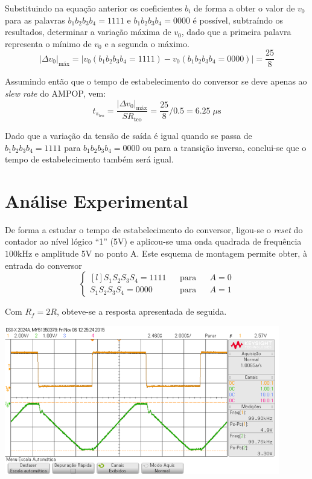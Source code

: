 \documentclass[a4paper,11pt]{report}
\begin{document}
Substituindo na equação anterior os coeficientes $b_i$ de forma a obter o valor de $v_0$ para as palavras $b_1b_2b_3b_4=1111$ e $b_1b_2b_3b_4=0000$ é possível, subtraíndo os resultados, determinar a variação máxima de $v_0$, dado que a primeira palavra representa o mínimo de $v_0$ e a segunda o máximo.
\begin{equation}
|\Delta v_0|_{\textrm{máx}}=|v_0(b_1b_2b_3b_4=1111)-v_0(b_1b_2b_3b_4=0000)|=\frac{25}{8}
\end{equation}

Assumindo então que o tempo de estabelecimento do conversor se deve apenas ao \emph{slew rate} do AMPOP, vem:
\begin{equation}
t_{s_{\textrm{teo}}}=\dfrac{|\Delta v_0|_{\textrm{máx}}}{SR_{\textrm{teo}}}=\frac{25}{8}/0.5=6.25\;\mu\textrm{s}
\end{equation}

Dado que a variação da tensão de saída é igual quando se passa de $b_1b_2b_3b_4=1111$ para $b_1b_2b_3b_4=0000$ ou para a transição inversa, conclui-se que o tempo de estabelecimento também será igual.

\section{Análise Experimental}

De forma a estudar o tempo de estabelecimento do conversor, ligou-se o \emph{reset} do contador ao nível lógico ``1'' (5V) e aplicou-se uma onda quadrada de frequência $100$kHz e amplitude 5V no ponto A. Este esquema de montagem permite obter, à entrada do conversor
\begin{equation*}
\left\{ \begin{matrix*}[l]
 S_1S_2S_3S_4=1111 && \textrm{para} && A=0\\[0.3cm]
 S_1S_2S_3S_4=0000 && \textrm{para} && A=1
\end{matrix*} \right.
\end{equation*}

Com $R_f=2R$, obteve-se a resposta apresentada de seguida.


\begin{center}
     \includegraphics[angle=0,width=0.9\textwidth]{ts2R.png}
     \label{fig:ts2R}
     \end{center}
\end{document}
